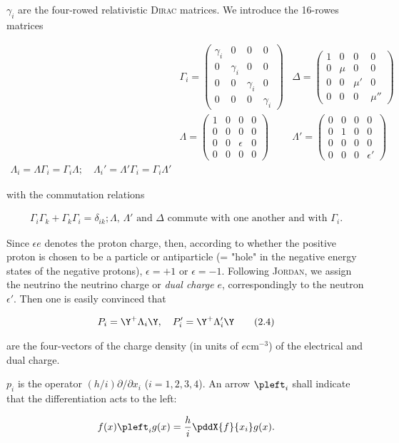 \documentclass{article}
\newcommand{\nequ}[2]{
\begin{align*}
#1
\tag{#2}
\end{align*}
}
\newcommand{\uequ}[1]{
\begin{align*}
#1
\end{align*}
}
\begin{document}
$\gamma_i$ are the four-rowed relativistic \textsc{Dirac} matrices. We introduce the 16-rowes matrices
\nequ{
&\Gamma_i = \left(
\begin{matrix}
\gamma_i & 0 & 0 & 0\\
0 & \gamma_i & 0 & 0\\
0 & 0 & \gamma_i & 0\\
0 & 0 & 0 & \gamma_i
\end{matrix}
\right)
& \Delta = \left(\begin{matrix}
1 & 0 & 0 & 0\\
0 & \mu & 0 & 0\\
0 & 0 & \mu' & 0\\
0 & 0 & 0 & \mu''
\end{matrix}\right)\\
&\Lambda = \left(\begin{matrix}
1 & 0 & 0 & 0\\
0 & 0 & 0 & 0\\
0 & 0 & \epsilon & 0\\
0 & 0 & 0 & 0
\end{matrix}\right)
&\Lambda' = \left(\begin{matrix}
0 & 0 & 0 & 0\\
0 & 1 & 0 & 0\\
0 & 0 & 0 & 0\\
0 & 0 & 0 & \epsilon'
\end{matrix}\right)\\
\Lambda_i = \Lambda\Gamma_i = \Gamma_i\Lambda;\quad
\Lambda_i' = \Lambda'\Gamma_i = \Gamma_i \Lambda'
}{2.2}
with the commutation relations
\nequ{
\Gamma_i \Gamma_k + \Gamma_k \Gamma_i = \delta_{ik};
\text{$\Lambda$, $\Lambda'$ and $\Delta$ commute with one another and with $\Gamma_i$.}
}{2.3}
Since $\epsilon e$ denotes the proton charge, then, according to whether the positive proton is chosen to be a particle or antiparticle (= "hole" in the negative energy states of the negative protons), $\epsilon = +1$ or $\epsilon = -1$. Following \textsc{Jordan}, we assign the neutrino the neutrino charge or \textit{dual charge} $e$, correspondingly to the neutron $\epsilon'$\cite{8}. Then one is easily convinced that
\nequ{
P_i = \Y^+\Lambda_i \Y, \quad P_i' = \Y^+ \Lambda_i' \Y
}{2.4}
are the four-vectors of the charge density (in units of $e\text{cm}^{-3}$) of the electrical and dual charge.

$p_i$ is the operator $(h/i) \partial/\partial x_i$ ($i=1,2,3,4$). An arrow $\pleft_i$ shall indicate that the differentiation acts to the left:
\uequ{
f(x)\pleft_i g(x) = \frac{h}{i}\pddX{f}{x_i}g(x).
}
\end{document}
